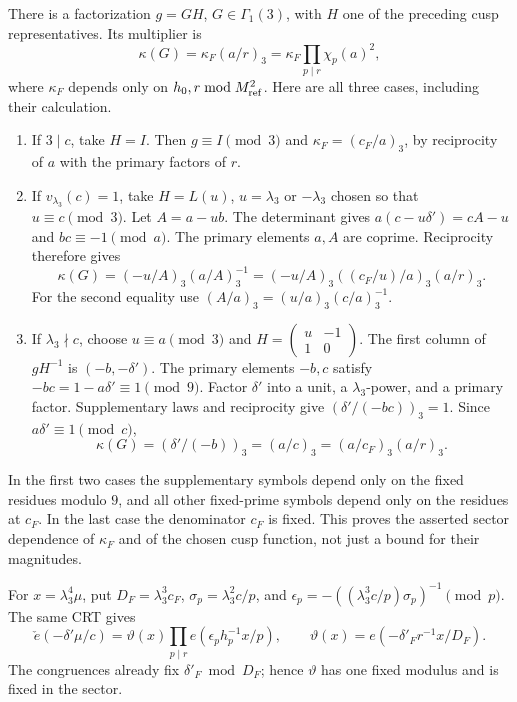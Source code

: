 \documentclass[12pt]{article}
\begin{document}
There is a factorization \(g=G H\), \(G\in\Gamma_1(3)\),
with \(H\) one of the preceding cusp representatives.  Its
multiplier is
\[
 \kappa(G)=\kappa_F(a/r)_3
          =\kappa_F\prod_{p\mid r}\chi_p(a)^2 ,
 \tag{B8}\label{eq:fixed-cusp-multiplier}
\]
where \(\kappa_F\) depends only on \(h_0,r\bmod M_{\rm ref}^2\).
Here are all three cases, including their calculation.
\begin{enumerate}
\item If \(3\mid c\), take \(H=I\).
Then \(g\equiv I\pmod3\) and
\(\kappa_F=(c_F/a)_3\), by reciprocity of \(a\) with the
primary factors of \(r\).
\item If \(v_{\lambda_3}(c)=1\), take
\(H=L(u)\), \(u=\lambda_3\) or \(-\lambda_3\) chosen so that
\(u\equiv c\pmod3\).  Let \(A=a-ub\).
The determinant gives \(a(c-u\delta')=cA-u\) and
\(bc\equiv-1\pmod a\).
The primary elements \(a,A\) are coprime.  Reciprocity therefore gives
\[
 \kappa(G)=(-u/A)_3(a/A)_3^{-1}
          =(-u/A)_3((c_F/u)/a)_3(a/r)_3.
\]
For the second equality use
\((A/a)_3=(u/a)_3(c/a)_3^{-1}\).
\item If \(\lambda_3\nmid c\), choose \(u\equiv a\pmod3\) and
\(H=\left(\begin{smallmatrix}u&-1\\1&0\end{smallmatrix}\right)\).
The first column of \(gH^{-1}\) is \((-b,-\delta')\).
The primary elements \(-b,c\) satisfy
\(-bc=1-a\delta'\equiv1\pmod9\).
Factor \(\delta'\) into a unit, a \(\lambda_3\)-power, and a
primary factor.  Supplementary laws and reciprocity give
\((\delta'/(-bc))_3=1\).  Since \(a\delta'\equiv1\pmod c\),
\[
 \kappa(G)=(\delta'/(-b))_3=(a/c)_3
                          =(a/c_F)_3(a/r)_3 .
\]
\end{enumerate}
In the first two cases the supplementary symbols depend only on
the fixed residues modulo \(9\), and all other fixed-prime symbols
depend only on the residues at \(c_F\).
In the last case the denominator \(c_F\) is fixed.
This proves the asserted sector dependence of \(\kappa_F\) and
of the chosen cusp function, not just a bound for their magnitudes.

For \(x=\lambda_3^4\mu\), put
\(D_F=\lambda_3^3c_F\),
\(\sigma_p=\lambda_3^2c/p\), and
\(\epsilon_p=-((\lambda_3^3c/p)\sigma_p)^{-1}\pmod p\).
The same CRT gives
\[
 \check e(-\delta'\mu/c)
   =\vartheta(x)\prod_{p\mid r}e(\epsilon_p h_p^{-1}x/p),
 \qquad
 \vartheta(x)=e(-\delta'_F r^{-1}x/D_F).
 \tag{B9}
\]
The congruences already fix \(\delta'_F\bmod D_F\); hence
\(\vartheta\) has one fixed modulus and is fixed in the sector.
\end{document}
